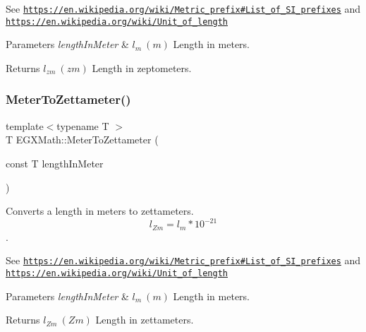 See \href{https://en.wikipedia.org/wiki/Metric_prefix#List_of_SI_prefixes}{\tt https\+://en.\+wikipedia.\+org/wiki/\+Metric\+\_\+prefix\#\+List\+\_\+of\+\_\+\+S\+I\+\_\+prefixes} and \href{https://en.wikipedia.org/wiki/Unit_of_length}{\tt https\+://en.\+wikipedia.\+org/wiki/\+Unit\+\_\+of\+\_\+length} 
\begin{DoxyParams}{Parameters}
{\em length\+In\+Meter} & $ l_{m}\ (m)$ Length in meters. \\
\hline
\end{DoxyParams}
\begin{DoxyReturn}{Returns}
$ l_{zm}\ (zm)$ Length in zeptometers. 
\end{DoxyReturn}
\mbox{\label{group___e_g_x_math-_conversions-_length_conversions-_s_i-_meter-_s_i_gafbd51e362ddfd28f270450693783f5c6}} 
\subsubsection{\texorpdfstring{Meter\+To\+Zettameter()}{MeterToZettameter()}}
{\footnotesize\ttfamily template$<$typename T $>$ \\
T E\+G\+X\+Math\+::\+Meter\+To\+Zettameter (\begin{DoxyParamCaption}\item[{const T}]{length\+In\+Meter }\end{DoxyParamCaption})}



Converts a length in meters to zettameters. \[ l_{Zm}=l_{m} * 10^{-21} \]. 

See \href{https://en.wikipedia.org/wiki/Metric_prefix#List_of_SI_prefixes}{\tt https\+://en.\+wikipedia.\+org/wiki/\+Metric\+\_\+prefix\#\+List\+\_\+of\+\_\+\+S\+I\+\_\+prefixes} and \href{https://en.wikipedia.org/wiki/Unit_of_length}{\tt https\+://en.\+wikipedia.\+org/wiki/\+Unit\+\_\+of\+\_\+length} 
\begin{DoxyParams}{Parameters}
{\em length\+In\+Meter} & $ l_{m}\ (m)$ Length in meters. \\
\hline
\end{DoxyParams}
\begin{DoxyReturn}{Returns}
$ l_{Zm}\ (Zm)$ Length in zettameters. 
\end{DoxyReturn}
